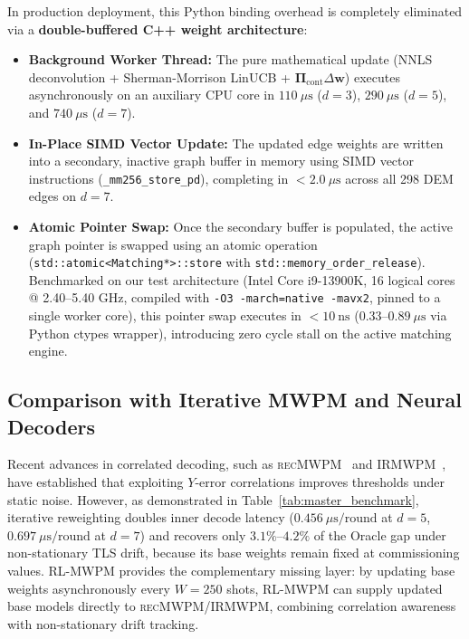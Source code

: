 \documentclass[aps,prxquantum,reprint,superscriptaddress,floatfix,nofootinbib]{revtex4-2}
\begin{document}
In production deployment, this Python binding overhead is completely eliminated via a \textbf{double-buffered C++ weight architecture}:
\begin{itemize}
    \item \textbf{Background Worker Thread:} The pure mathematical update (NNLS deconvolution + Sherman-Morrison LinUCB + $\mathbf{\Pi}_{\text{cont}}\Delta\mathbf{w}$) executes asynchronously on an auxiliary CPU core in $110\ \mu\text{s}$ ($d=3$), $290\ \mu\text{s}$ ($d=5$), and $740\ \mu\text{s}$ ($d=7$).
    \item \textbf{In-Place SIMD Vector Update:} The updated edge weights are written into a secondary, inactive graph buffer in memory using SIMD vector instructions (\texttt{\_mm256\_store\_pd}), completing in $<\!2.0\ \mu\text{s}$ across all 298 DEM edges on $d=7$.
    \item \textbf{Atomic Pointer Swap:} Once the secondary buffer is populated, the active graph pointer is swapped using an atomic operation (\texttt{std::atomic\textless Matching*\textgreater::store} with \texttt{std::memory\_order\_release}). Benchmarked on our test architecture (Intel Core i9-13900K, 16 logical cores @ 2.40--5.40 GHz, compiled with \texttt{-O3 -march=native -mavx2}, pinned to a single worker core), this pointer swap executes in $<\!10\ \text{ns}$ ($0.33\text{--}0.89\ \mu\text{s}$ via Python ctypes wrapper), introducing zero cycle stall on the active matching engine.
\end{itemize}

\subsection{Comparison with Iterative MWPM and Neural Decoders}
Recent advances in correlated decoding, such as \textsc{recMWPM}~\cite{cowtan2023correlated} and \textsc{IRMWPM}~\cite{tian2025iterative}, have established that exploiting $Y$-error correlations improves thresholds under static noise. However, as demonstrated in Table~\ref{tab:master_benchmark}, iterative reweighting doubles inner decode latency ($0.456\ \mu\text{s}/\text{round}$ at $d=5$, $0.697\ \mu\text{s}/\text{round}$ at $d=7$) and recovers only $3.1\%\text{--}4.2\%$ of the Oracle gap under non-stationary TLS drift, because its base weights remain fixed at commissioning values. RL-MWPM provides the complementary missing layer: by updating base weights asynchronously every $W=250$ shots, RL-MWPM can supply updated base models directly to \textsc{recMWPM}/\textsc{IRMWPM}, combining correlation awareness with non-stationary drift tracking.
\end{document}
